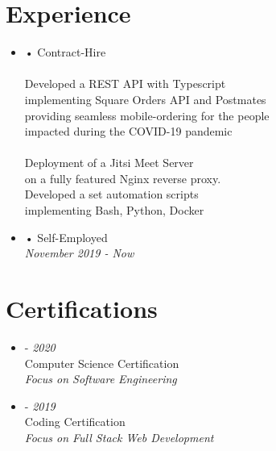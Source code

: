 \documentclass[10pt,oneside,a4paper,titlepage]{article}
\begin{document}
\begin{tcolorbox}
\begin{minipage}[t]{10cm}
\begin{tcolorbox}[grow to right by=1cm,colframe=white,colback=white]
      \section*{Experience}
      \vspace{-0.2cm}
      \begin{itemize}
        \item{
            {{} • Contract-Hire}
            \vspace{0.2cm}\\
            \emph{}\\
            {Developed a {{REST API}} with {{Typescript}}}\\
            {implementing {{Square Orders API}} and {{Postmates}}}\\
            {providing seamless mobile-ordering for the people}\\
            {impacted during the COVID-19 pandemic}
            \vspace{0.2cm}\\
            \emph{}\\
            {Deployment of a {Jitsi Meet} Server}\\
            {on a fully featured {Nginx} reverse proxy}.\\
            {Developed a set automation scripts}\\
            {implementing {Bash}, {Python}, {Docker}}

        }
        \item{
            {{} • Self-Employed}\\
            \emph{November 2019 - Now}
          }
      \end{itemize}

      \vspace{-0.6cm}
      \section*{Certifications}
      \vspace{-0.2cm}
      \begin{itemize}[]
        \item{
            {{} - \footnotesize{\emph{2020}}}\\
            Computer Science Certification\\
            \emph{Focus on Software Engineering}
          }
        \item{
            {{} - \footnotesize{\emph{2019}}}\\
            {Coding Certification}\\
            \emph{Focus on Full Stack Web Development}
          }
      \end{itemize}


\end{tcolorbox}
\end{minipage}
\end{tcolorbox}
\end{document}
